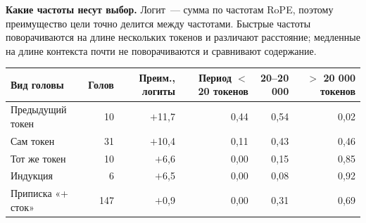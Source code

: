 \documentclass[10pt]{article}
\begin{document}
\noindent\begin{minipage}{\linewidth}
\textbf{Какие частоты несут выбор.} Логит~— сумма по частотам RoPE, поэтому преимущество цели точно делится между частотами. Быстрые частоты поворачиваются на длине нескольких токенов и различают расстояние; медленные на длине контекста почти не поворачиваются и сравнивают содержание.
\begin{center}{\small\begin{tabular}{|l|r|r|r|r|r|}\hline
\rowcolor{head}\textbf{Вид головы} & \textbf{Голов} & \textbf{Преим., логиты} & \textbf{Период $<$ 20 токенов} & \textbf{20–20 000} & \textbf{$>$ 20 000 токенов} \\ \hline
Предыдущий токен & 10 & $+$11,7 & 0,44 & 0,54 & 0,02 \\ \hline
Сам токен & 31 & $+$10,4 & 0,11 & 0,43 & 0,46 \\ \hline
Тот же токен & 10 & $+$6,6 & 0,00 & 0,15 & 0,85 \\ \hline
Индукция & 6 & $+$6,5 & 0,00 & 0,08 & 0,92 \\ \hline
Приписка «+ сток» & 147 & $+$0,9 & 0,00 & 0,31 & 0,69 \\ \hline
\hline\end{tabular}}\end{center}
\end{minipage}
\par
\end{document}
